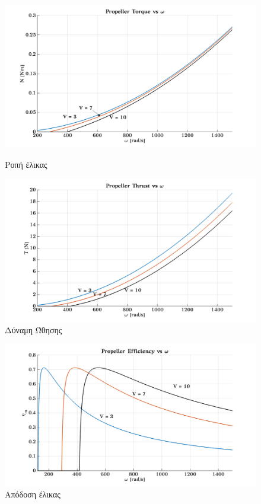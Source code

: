 \begin{figure}[H]
    \begin{minipage}[b]{0.48\linewidth}
        \centering
        \includegraphics[width=\textwidth]{Motor/fig_M_omega.png}
        \caption{Ροπή έλικας}
        \label{fig_Mw}
    \end{minipage}
    \quad
    \begin{minipage}[b]{0.48\linewidth}
        \centering
        \includegraphics[width=\textwidth]{Motor/fig_T_omega.png}
        \caption{Δύναμη Ώθησης}
        \label{fig_Tw}
    \end{minipage}
\end{figure}
\begin{figure}[H]
    \centering
    \includegraphics[scale=0.25]{Motor/fig_np_omega.png}
    \caption{Απόδοση έλικας}
    \label{fig_npw}
\end{figure}


